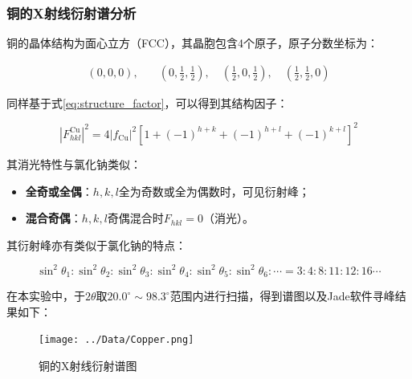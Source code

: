 \documentclass{thuemp}
\begin{document}
\subsubsection{铜的X射线衍射谱分析}

铜的晶体结构为面心立方（FCC），其晶胞包含4个原子，原子分数坐标为：

\begin{align*}
(0,0,0),\quad &\left(0,\frac{1}{2},\frac{1}{2}\right),\quad \left(\frac{1}{2},0,\frac{1}{2}\right),\quad \left(\frac{1}{2},\frac{1}{2},0\right)
\end{align*}

同样基于式\ref{eq:structure_factor}，可以得到其结构因子：

\begin{equation}
    |F_{hkl}^{\text{Cu}}|^2 = 4|f_{\text{Cu}}|^2\left[1 + (-1)^{h+k} + (-1)^{h+l} + (-1)^{k+l}\right]^2
    \label{eq:cu_struct_fac}
\end{equation}

其消光特性与氯化钠类似：

\begin{itemize}
    \item \textbf{全奇或全偶}：$h,k,l$全为奇数或全为偶数时，可见衍射峰；
    \item \textbf{混合奇偶}：$h,k,l$奇偶混合时$F_{hkl}=0$（消光）。
\end{itemize}

其衍射峰亦有类似于氯化钠的特点：

\begin{equation}
    \sin^2\theta_1 : \sin^2\theta_2: \sin^2\theta_3 : \sin^2\theta_4 : \sin^2\theta_5 : \sin^2\theta_6 : \cdots =
    3 : 4 : 8 : 11 : 12: 16 \cdots
    \label{eq:cu_diff_patt}
\end{equation}

在本实验中，于$2\theta$取$20.0^\circ \sim 98.3^\circ$范围内进行扫描，得到谱图以及Jade软件寻峰结果如下：

\begin{figure}[H]
    \centering
    \texttt{[image: ../Data/Copper.png]}
    \caption{铜的X射线衍射谱图}
    \label{fig:cu_xrd}
\end{figure}
\end{document}
